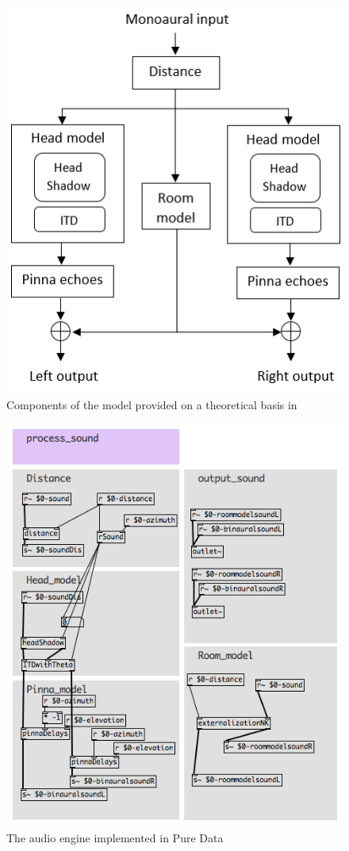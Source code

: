 \documentclass[journal]{IEEEtran}
\begin{document}
\begin{figure}[h!]
	\centering
		\includegraphics[scale=0.75]{graphics/graphic.png}
	\caption{Components of the model provided on a theoretical basis in~\cite{Brown1997}}
	\label{fig:workflow}
\end{figure}

\begin{figure}[h!]
  \centering
    \includegraphics[scale=0.5]{graphics/audioengine.png}
  \caption{The audio engine implemented in Pure Data}
  \label{fig:augioengine}
\end{figure}
\end{document}
